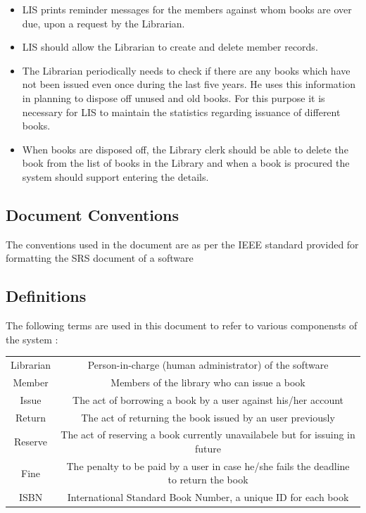 \documentclass{article}
\begin{document}
\begin{itemize}
\item LIS prints reminder messages for the members against whom books are over due, upon a request by the
Librarian.
\item LIS should allow the Librarian to create and delete member records.
\item The Librarian periodically needs to check if there are any books which have not been issued even once
during the last five years. He uses this information in planning to dispose off unused and old books. For
this purpose it is necessary for LIS to maintain the statistics regarding issuance of different books.
\item When books are disposed off, the Library clerk should be able to delete the book from the list of books
in the Library and when a book is procured the system should support entering the details.
\end{itemize}
\subsection{Document Conventions}
The conventions used in the document are as per the IEEE standard provided for formatting the SRS document of a software

\subsection{Definitions}
The following terms are used in this document to refer to various componensts of the system :\\

\begin{tabular}{ c| c }
 Librarian & Person-in-charge (human administrator) of the software\\
 Member & Members of the library who can issue a book\\
 Issue & The act of borrowing a book by a user against his/her account\\
 Return & The act of returning the book issued by an user previously \\
 Reserve & The act of reserving a book currently unavailabele but for issuing in future\\
 Fine & The penalty to be paid by a user in case he/she fails the deadline to return the book\\
 ISBN & International Standard Book Number, a unique ID for each book
\end{tabular}	
\end{document}
